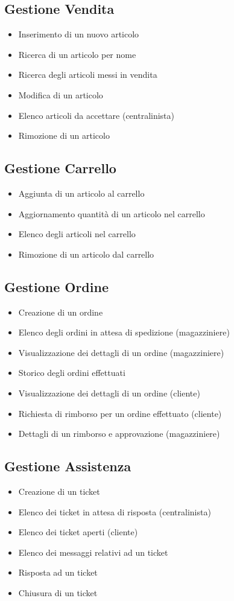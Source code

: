 \documentclass[12pt]{article}
\begin{document}
\subsection{Gestione Vendita}
\begin{itemize}
\item Inserimento di un nuovo articolo
\item Ricerca di un articolo per nome
\item Ricerca degli articoli messi in vendita
\item Modifica di un articolo
\item Elenco articoli da accettare (centralinista)
\item Rimozione di un articolo
\end{itemize}

\subsection{Gestione Carrello}
\begin{itemize}
\item Aggiunta di un articolo al carrello
\item Aggiornamento quantità di un articolo nel carrello
\item Elenco degli articoli nel carrello
\item Rimozione di un articolo dal carrello
\end{itemize}

\subsection{Gestione Ordine}
\begin{itemize}
\item Creazione di un ordine
\item Elenco degli ordini in attesa di spedizione (magazziniere)
\item Visualizzazione dei dettagli di un ordine (magazziniere)
\item Storico degli ordini effettuati
\item Visualizzazione dei dettagli di un ordine (cliente)
\item Richiesta di rimborso per un ordine effettuato (cliente)
\item Dettagli di un rimborso e approvazione (magazziniere)
\end{itemize}

\subsection{Gestione Assistenza}
\begin{itemize}
\item Creazione di un ticket
\item Elenco dei ticket in attesa di risposta (centralinista)
\item Elenco dei ticket aperti (cliente)
\item Elenco dei messaggi relativi ad un ticket
\item Risposta ad un ticket
\item Chiusura di un ticket
\end{itemize}
\end{document}
